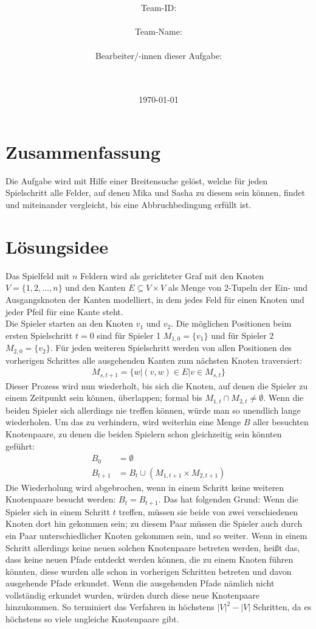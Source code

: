 \documentclass[a4paper,10pt,ngerman]{scrartcl}
\title{\textbf{\Huge\Aufgabe}}
\author{\LARGE Team-ID: \LARGE \TeamId \\\\
	    \LARGE Team-Name: \LARGE \TeamName \\\\
	    \LARGE Bearbeiter/-innen dieser Aufgabe: \\ 
	    \LARGE \Namen\\\\}
\date{\LARGE\today}
\begin{document}
\maketitle
\tableofcontents

\vspace{0.5cm}


\section{Zusammenfassung}
Die Aufgabe wird mit Hilfe einer Breitensuche gelöst, welche für jeden Spielschritt alle Felder, auf denen Mika und Sasha zu diesem sein können, findet und miteinander vergleicht, bis eine Abbruchbedingung erfüllt ist.
\section{Lösungsidee}
Das Spielfeld mit $n$ Feldern wird als gerichteter Graf mit den Knoten $V=\{1,2,...,n\}$ und den Kanten $E \subseteq V \times V$ als Menge von 2-Tupeln der Ein- und Ausgangsknoten der Kanten modelliert, in dem jedes Feld für einen Knoten und jeder Pfeil für eine Kante steht. \\
Die Spieler starten an den Knoten $v_1$ und $v_2$. Die möglichen Positionen beim ersten Spielschritt $t=0$ sind für Spieler 1 $M_{1,0}=\{v_1\}$ und für Spieler 2 $M_{2,0}=\{v_2\}$. Für jeden weiteren Spielschritt werden von allen Positionen des vorherigen Schrittes alle ausgehenden Kanten zum nächsten Knoten traversiert: 
\begin{align*}
M_{s,t+1} = \{w | (v, w) \in E | v \in M_{s, t}\} 
\end{align*}
Dieser Prozess wird nun wiederholt, bis sich die Knoten, auf denen die Spieler zu einem Zeitpunkt sein können, überlappen; formal bis $M_{1, t} \cap M_{2, t} \neq \emptyset$. Wenn die beiden Spieler sich allerdings nie treffen können, würde man so unendlich lange wiederholen. Um das zu verhindern, wird weiterhin eine Menge $B$ aller besuchten Knotenpaare, zu denen die beiden Spielern schon gleichzeitig sein könnten geführt:
\begin{align*}
B_0 &= \emptyset \\
B_{t+1} &= B_{t} \cup (M_{1,t+1} \times M_{2, t+1})
\end{align*}
Die Wiederholung wird abgebrochen, wenn in einem Schritt keine weiteren Knotenpaare besucht werden: $B_t = B_{t+1}$. Das hat folgenden Grund: Wenn die Spieler sich in einem Schritt $t$ treffen, müssen sie beide von zwei verschiedenen Knoten dort hin gekommen sein; zu diesem Paar müssen die Spieler auch durch ein Paar unterschiedlicher Knoten gekommen sein, und so weiter. Wenn in einem Schritt allerdings keine neuen solchen Knotenpaare betreten werden, heißt das, dass keine neuen Pfade entdeckt werden können, die zu einem Knoten führen könnten, diese wurden alle schon in vorherigen Schritten betreten und davon ausgehende Pfade erkundet. Wenn die ausgehenden Pfade nämlich nicht vollständig erkundet wurden, würden durch diese neue Knotenpaare hinzukommen. So terminiert das Verfahren in höchstens $|V|^2 - |V|$ Schritten, da es höchstens so viele ungleiche Knotenpaare gibt. \\
\end{document}
